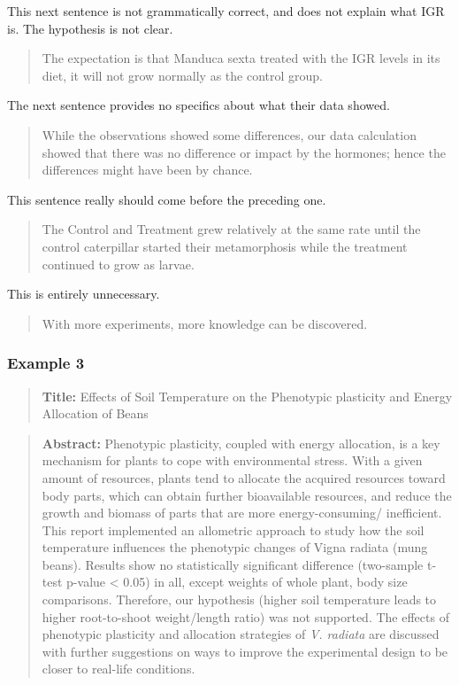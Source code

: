 \documentclass[
]{book}
\begin{document}
This next sentence is not grammatically correct, and does not explain what IGR is. The hypothesis is not clear.

\begin{quote}
The expectation is that Manduca sexta treated with the IGR levels in its diet, it will not grow normally as the control group.
\end{quote}

The next sentence provides no specifics about what their data showed.

\begin{quote}
While the observations showed some differences, our data calculation showed that there was no difference or impact by the hormones; hence the differences might have been by chance.
\end{quote}

This sentence really should come before the preceding one.

\begin{quote}
The Control and Treatment grew relatively at the same rate until the control caterpillar started their metamorphosis while the treatment continued to grow as larvae.
\end{quote}

This is entirely unnecessary.

\begin{quote}
With more experiments, more knowledge can be discovered.
\end{quote}

\hypertarget{example-3}{%
\subsubsection{Example 3}\label{example-3}}

\begin{quote}
\textbf{Title:} Effects of Soil Temperature on the Phenotypic plasticity and Energy Allocation of Beans
\end{quote}

\begin{quote}
\textbf{Abstract:} Phenotypic plasticity, coupled with energy allocation, is a key mechanism for plants to cope with environmental stress. With a given amount of resources, plants tend to allocate the acquired resources toward body parts, which can obtain further bioavailable resources, and reduce the growth and biomass of parts that are more energy-consuming/ inefficient. This report implemented an allometric approach to study how the soil temperature influences the phenotypic changes of Vigna radiata (mung beans). Results show no statistically significant difference (two-sample t-test p-value \textless{} 0.05) in all, except weights of whole plant, body size comparisons. Therefore, our hypothesis (higher soil temperature leads to higher root-to-shoot weight/length ratio) was not supported. The effects of phenotypic plasticity and allocation strategies of \emph{V. radiata} are discussed with further suggestions on ways to improve the experimental design to be closer to real-life conditions.
\end{quote}
\end{document}

